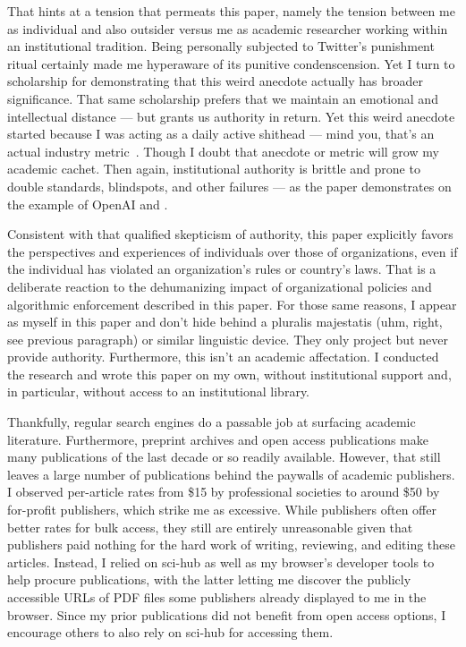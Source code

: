 That hints at a tension that permeats this paper, namely the tension between me
as individual and also outsider versus me as academic researcher working within
an institutional tradition. Being personally subjected to Twitter's punishment
ritual certainly made me hyperaware of its punitive condenscension. Yet I turn
to scholarship for demonstrating that this weird anecdote actually has broader
significance. That same scholarship prefers that we maintain an emotional and
intellectual distance --- but grants us authority in return. Yet this weird
anecdote started because I was acting as a daily active shithead --- mind you,
that's an actual industry metric~\cite{}. Though I doubt that anecdote or metric
will grow my academic cachet. Then again, institutional authority is brittle and
prone to double standards, blindspots, and other failures --- as the paper
demonstrates on the example of OpenAI and \DALLE{}.

Consistent with that qualified skepticism of authority, this paper explicitly
favors the perspectives and experiences of individuals over those of
organizations, even if the individual has violated an organization's rules or
country's laws. That is a deliberate reaction to the dehumanizing impact of
organizational policies and algorithmic enforcement described in this paper. For
those same reasons, I appear as myself in this paper and don't hide behind a
pluralis majestatis (uhm, right, see previous paragraph) or similar linguistic
device. They only project but never provide authority. Furthermore, this isn't
an academic affectation. I conducted the research and wrote this paper on my
own, without institutional support and, in particular, without access to an
institutional library.

Thankfully, regular search engines do a passable job at surfacing academic
literature. Furthermore, preprint archives and open access publications make
many publications of the last decade or so readily available. However, that
still leaves a large number of publications behind the paywalls of academic
publishers. I observed per-article rates from \$15 by professional societies to
around \$50 by for-profit publishers, which strike me as excessive. While
publishers often offer better rates for bulk access, they still are entirely
unreasonable given that publishers paid nothing for the hard work of writing,
reviewing, and editing these articles. Instead, I relied on sci-hub as well as
my browser's developer tools to help procure publications, with the latter
letting me discover the publicly accessible URLs of PDF files some publishers
already displayed to me in the browser. Since my prior publications did not
benefit from open access options, I encourage others to also rely on sci-hub for
accessing them.


